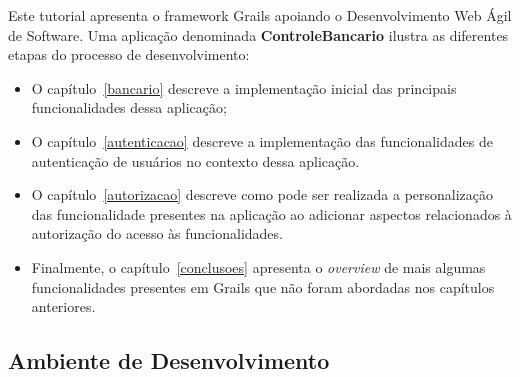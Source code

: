{\vspace{0.5cm}

Este tutorial apresenta  o framework Grails apoiando o  Desenvolvimento Web Ágil
de  Software.  Uma  aplicação   denominada  {\bf  ControleBancario}  ilustra  as
diferentes etapas do processo de desenvolvimento:

\begin{itemize}

\vspace{0.3cm}

\item O capítulo~\ref{bancario} descreve  a implementação inicial das principais
  funcionalidades dessa aplicação; 

\vspace{0.3cm}

\item O capítulo~\ref{autenticacao} descreve a implementação das funcionalidades
  de autenticação de usuários no contexto dessa aplicação.  

\vspace{0.3cm}

\item  O   capítulo~\ref{autorizacao}  descreve   como  pode  ser   realizada  a
  personalização das funcionalidade presentes na aplicação ao adicionar aspectos
  relacionados à autorização do acesso às funcionalidades. 



\vspace{0.3cm}
  
\item Finalmente, o capítulo~\ref{conclusoes} apresenta o {\it overview} de mais
  algumas  funcionalidades  presentes em  Grails  que  não  foram abordadas  nos
  capítulos anteriores.  
 
\end{itemize}

\subsection{Ambiente de Desenvolvimento}

}

